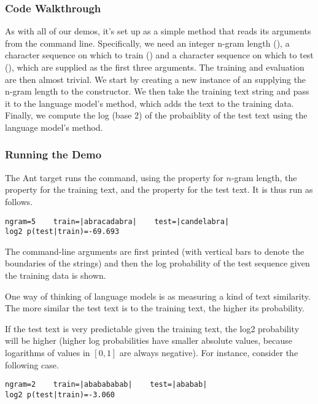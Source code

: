 \subsubsection{Code Walkthrough}

As with all of our demos, it's set up as a simple  method
that reads its arguments from the command line.  Specifically, we need
an integer n-gram length (), a character sequence on which
to train () and a character sequence on which to test
(), which are supplied as the first three arguments.
The training and evaluation are then almost trivial.
%
%
We start by creating a new instance of an 
supplying the n-gram length to the constructor.  We then take the
training text string and pass it to the language model's
 method, which adds the text to the
training data.  Finally, we compute the log (base 2) of the
probaiblity of the test text using the language model's
 method.  

\subsubsection{Running the Demo}

The Ant target  runs the command, using
the property  for $n$-gram length, the property
 for the training text, and the property
 for the test text.  It is thus run as
follows.
%
\begin{verbatim}
ngram=5    train=|abracadabra|    test=|candelabra|
log2 p(test|train)=-69.693
\end{verbatim}
%
The command-line arguments are first printed (with vertical bars to
denote the boundaries of the strings) and then the log probability of
the test sequence given the training data is shown.

One way of thinking of language models is as measuring a kind
of text similarity.  The more similar the test text is to the
training text, the higher its probability.

If the test text is very predictable given the training text, the log2
probability will be higher (higher log probabilities have smaller
absolute values, because logarithms of values in $[0,1]$ are always
negative).  For instance, consider the following case.
%
\begin{verbatim}
ngram=2    train=|ababababab|    test=|ababab|
log2 p(test|train)=-3.060
\end{verbatim}

